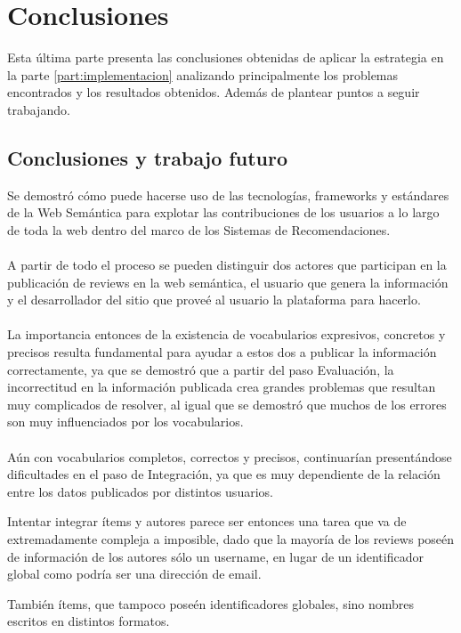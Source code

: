 \part{Conclusiones}

Esta última parte presenta las conclusiones obtenidas de aplicar la estrategia en la parte \ref{part:implementacion} 
analizando principalmente los problemas encontrados y los resultados obtenidos.
Además de plantear puntos a seguir trabajando.

\chapter{Conclusiones y trabajo futuro}
\label{chapter:conclusiones}

Se demostró cómo puede hacerse uso de las tecnologías, frameworks y estándares de la Web 
Semántica para explotar las contribuciones de los usuarios a lo largo de toda la web dentro 
del marco de los Sistemas de Recomendaciones.
\\\\
A partir de todo el proceso se pueden distinguir dos actores que participan en la publicación 
de reviews en la web semántica, el usuario que genera la información y el desarrollador
del sitio que proveé al usuario la plataforma para hacerlo.
\\\\
La importancia entonces de la existencia de vocabularios expresivos, concretos y precisos 
resulta fundamental para ayudar a estos dos a publicar la información correctamente, ya que 
se demostró que a partir del paso Evaluación, la incorrectitud en la información publicada 
crea grandes problemas que resultan muy complicados de resolver, al igual que se demostró 
que muchos de los errores son muy influenciados por los vocabularios.
\\\\
Aún con vocabularios completos, correctos y precisos, continuarían presentándose dificultades en 
el paso de Integración, ya que es muy dependiente de la relación entre los datos publicados 
por distintos usuarios.

Intentar integrar ítems y autores parece ser entonces una tarea que va de extremadamente compleja 
a imposible, dado que la mayoría de los reviews poseén de información de los autores sólo un username, 
en lugar de un identificador global como podría ser una dirección de email.

También ítems, que tampoco poseén identificadores globales, sino nombres escritos en 
distintos formatos.

